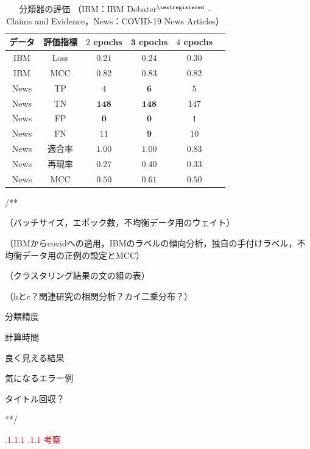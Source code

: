\documentclass[a4paper, twocolumn, 10pt]{jarticle}
\makeatletter
\def\section{%
	\@startsection{section}{1}{\z@}%
	{.1\Cvs \@plus.1\Cdp \@minus.1\Cdp}%
	{.1\Cvs \@plus.1\Cdp}%
	{\normalfont\normalsize\bfseries}%
}
\makeatother
\begin{document}

\begin{table}[H]
  \caption{
    分類器の評価
    （IBM：IBM Debater$^{\textregistered}$ - Claims and Evidence，News：COVID-19 News Articles）
    }
  \centering
  {\tabcolsep=0.15cm
    \begin{tabular}{cccccp{6cm}}
    \hline
    データ & 評価指標 & $2$ epochs & $\mathbf{3}$ \textbf{epochs} & $4$ epochs
    \\
    \hline
    IBM & Loss & $\mathbf{0.21}$ & $0.24$ & $0.30$
    \\
    IBM & MCC & $0.82$ & $\mathbf{0.83}$ & $0.82$
    \\
    News & TP & $4$ & $\mathbf{6}$ & $5$
    \\
    News & TN & $\mathbf{148}$ & $\mathbf{148}$ & $147$
    \\
    News & FP & $\mathbf{0}$ & $\mathbf{0}$ & $1$
    \\
    News & FN & $11$ & $\mathbf{9}$ & $10$
    \\
    News & 適合率 & $\mathbf{1.00}$ & $\mathbf{1.00}$ & $0.83$
    \\
    News & 再現率 & $0.27$ & $\mathbf{0.40}$ & $0.33$
    \\
    News & MCC & $0.50$ & $\mathbf{0.61}$ & $0.50$
    \\
    \hline
    \end{tabular}
  }
  \label{classification_evaluation}
\end{table}

/**

（バッチサイズ，エポック数，不均衡データ用のウェイト）

（IBMからcovidへの適用，IBMのラベルの傾向分析，独自の手付けラベル，不均衡データ用の正例の設定とMCC）


（クラスタリング結果の文の組の表）

（hとc？関連研究の相関分析？カイ二乗分布？）


分類精度

計算時間

良く見える結果

気になるエラー例

タイトル回収？

**/

\textcolor{red}{\section{考察}}
\end{document}
